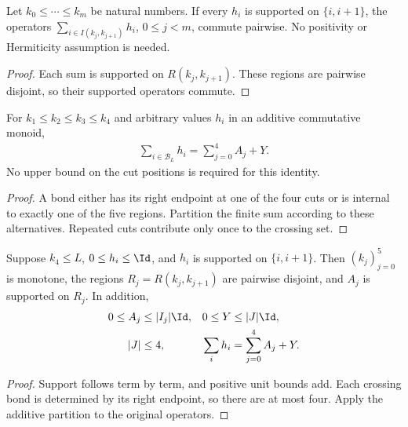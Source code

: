 \begin{lemma}
    \label{thm:consecutive_internal_sums_commute}
    \leanok
    Let $k_0\le\cdots\le k_m$ be natural numbers. If every $h_i$ is
    supported on $\{i,i+1\}$, the operators
    $\sum_{i\in I(k_j,k_{j+1})}h_i$, $0\le j<m$, commute pairwise.
    No positivity or Hermiticity assumption is needed.
\end{lemma}
\begin{proof}
    \leanok
    Each sum is supported on $R(k_j,k_{j+1})$. These regions are pairwise
    disjoint, so their supported operators commute.
\end{proof}

\begin{lemma}
    \label{thm:five_region_additive_partition}
    \leanok
    For $k_1\le k_2\le k_3\le k_4$ and arbitrary values $h_i$ in an
    additive commutative monoid,
    \begin{align}
        \sum_{i\in\mathcal B_L}h_i=\sum_{j=0}^4A_j+Y.
    \end{align}
    No upper bound on the cut positions is required for this identity.
\end{lemma}
\begin{proof}
    \leanok
    A bond either has its right endpoint at one of the four cuts or is
    internal to exactly one of the five regions. Partition the finite sum
    according to these alternatives. Repeated cuts contribute only once
    to the crossing set.
\end{proof}

\begin{lemma}
    \label{thm:five_region_original_bond_bounds}
    \leanok
    Suppose $k_4\le L$, $0\le h_i\le\Id$, and $h_i$ is supported on
    $\{i,i+1\}$. Then $(k_j)_{j=0}^5$ is monotone, the regions
    $R_j=R(k_j,k_{j+1})$ are pairwise disjoint, and $A_j$ is supported
    on $R_j$. In addition,
    \begin{align}
        0\le A_j & \le |I_j|\Id, & 0\le Y     & \le |J|\Id,\notag   \\
        |J|      & \le4,         & \sum_i h_i & =\sum_{j=0}^4A_j+Y.
    \end{align}
\end{lemma}
\begin{proof}
    \leanok
    Support follows term by term, and positive unit bounds add.
    Each crossing bond is determined by its right endpoint, so there are
    at most four. Apply the additive partition to the original operators.
\end{proof}

